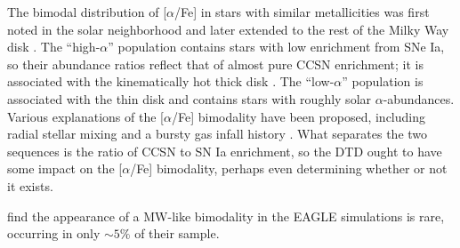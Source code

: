 \documentclass[twocolumn,twocolappendix,linenumbers]{aastex631}
\newcommand{\aFe}{[$\alpha$/Fe]\xspace}
\begin{document}

The bimodal distribution of \aFe in stars with similar metallicities was first noted in the solar neighborhood \citep[e.g.,][]{Furhmann1998-NearbyStars} and later extended to the rest of the Milky Way disk \citep{Nidever2014-ChemicalEvolutionAPOGEE,Hayden2015-ChemicalCartography}. The ``high-$\alpha$'' population contains stars with low enrichment from SNe Ia, so their abundance ratios reflect that of almost pure CCSN enrichment; it is associated with the kinematically hot thick disk \citep{Bensby2003-AbundanceTrends}. The ``low-$\alpha$'' population is associated with the thin disk and contains stars with roughly solar $\alpha$-abundances.
Various explanations of the \aFe bimodality have been proposed, including radial stellar mixing \citep{Schonrich2009-RadialMixing} and a bursty gas infall history \citep[e.g.,][]{Spitoni2021-TwoInfall}.
What separates the two sequences is the ratio of CCSN to SN Ia enrichment, so the DTD ought to have some impact on the \aFe bimodality, perhaps even determining whether or not it exists.

\citet{Mackereth2018-AlphaBimodality} find the appearance of a MW-like bimodality in the EAGLE simulations is rare, occurring in only $\sim5\%$ of their sample.

\end{document}
